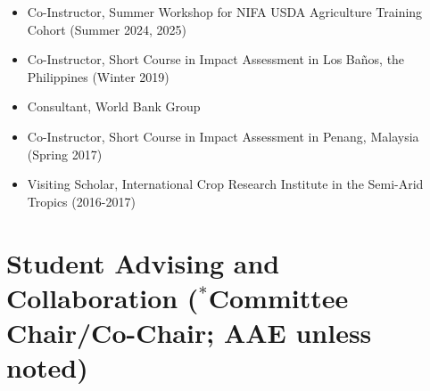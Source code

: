 \documentclass[letterpaper]{article}
\begin{document}
\begin{itemize}

\item Co-Instructor, Summer Workshop for NIFA USDA Agriculture Training Cohort (Summer 2024, 2025)
	
\item Co-Instructor, Short Course in Impact Assessment in Los Baños, the Philippines (Winter 2019)

\item Consultant, World Bank Group 
	
\item Co-Instructor, Short Course in Impact Assessment in Penang, Malaysia (Spring 2017)	
	
\item Visiting Scholar, International Crop Research Institute in the Semi-Arid Tropics (2016-2017)
	
\end{itemize}


\section*{Student Advising and Collaboration \small ($^*$Committee Chair/Co-Chair; AAE unless noted)}
\end{document}
